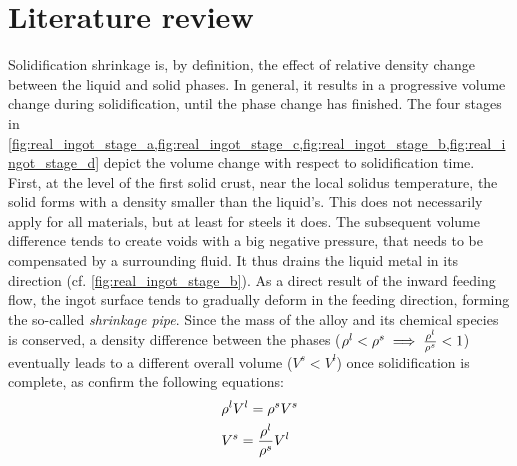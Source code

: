 \section{Literature review}
Solidification shrinkage is, by definition, the effect of relative density change between the liquid and solid phases.
In general, it results in a progressive volume change during solidification, until the phase change has finished. 
The four stages in \cref{fig:real_ingot_stage_a,fig:real_ingot_stage_c,fig:real_ingot_stage_b,fig:real_ingot_stage_d} depict the volume change with 
respect to solidification time.
First, at the level of the first solid crust, near the local solidus temperature, the solid forms with a density smaller than 
the liquid's. This does not necessarily apply for all materials, but at least for steels it does. The subsequent volume difference 
tends to create voids with a big negative pressure, that needs to be compensated by a surrounding fluid. It thus drains 
the liquid metal in its direction (cf. \autoref{fig:real_ingot_stage_b}). As a direct result of the inward feeding flow, the ingot surface
tends to gradually deform in the feeding direction, forming the so-called \emph{shrinkage pipe}. Since the mass of the alloy and its 
chemical species is conserved, a density difference between the phases ($\rho^l < \rho^s \implies \frac{\rho^l}{\rho^s}<1$) eventually leads 
to a different overall volume ($V^s<V^l$) once solidification is complete, as confirm the following equations:
\begin{subequations}
\begin{align}
& \rho^l V^l = \rho^s V^s  \\ 
& V^s = \frac{\rho^l}{\rho^s} V^l
\end{align}
\end{subequations}
